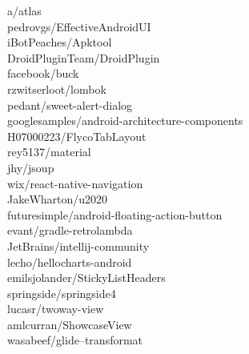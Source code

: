 \documentclass[twoside]{praca}
\begin{document}
\begin{multicols}{3}
a/atlas\\pedrovgs/Effective\-Android\-UI\\iBotPeaches/Apktool\\DroidPluginTeam/\-Droid\-Plugin\\facebook/buck\\rzwitserloot/lombok\\pedant/sweet-alert-dialog\\googlesamples/android-architecture-components\\H07000223/FlycoTabLayout\\rey5137/material\\jhy/jsoup\\wix/react-native-navigation\\JakeWharton/u2020\\futuresimple/android-floating-action-button\\evant/gradle-retrolambda\\JetBrains/intellij-community\\lecho/hellocharts-android\\emilsjolander/StickyList\-Headers\\springside/springside4\\lucasr/twoway-view\\amlcurran/ShowcaseView\\wasabeef/glide\---trans\-for\-ma\-t
\end{multicols}
\end{document}
